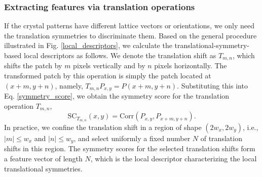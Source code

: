 \documentclass[twocolumn,amsmath, floatfix]{revtex4}
\begin{document}
\subsubsection{Extracting features via translation operations}
If the crystal patterns have different lattice vectors or orientations, we only need the translation symmetries to discriminate them.
Based on the general procedure illustrated in Fig. \ref{local_descriptors}, we calculate the translational-symmetry-based local descriptors as follows. We denote the translation shift as $T_{m,n}$, which shifts the patch by $m$ pixels vertically and by $n$ pixels horizontally.  The transformed patch by this operation is simply the patch located at $(x+m, y+n)$, namely, $T_{m,n}P_{x,y} = P(x+m, y+n)$. 
Substituting this into Eq. \eqref{symmetry_score}, we obtain the symmetry score for the translation operation $T_{m,n}$,
\begin{equation}
    \mathrm{SC}_{T_{m,n}} (x,y) = \mathrm{Corr}(P_{x,y}, P_{x+m, y+n}).
\end{equation}
In practice, we confine the translation shift in a region of shape $(2w_x,2w_y)$, i.e.,  $|m|\leq w_x$ and  $ |n|\leq w_y$, and select uniformly a fixed number $N$ of translation shifts in this region. The symmetry scores for the selected translation shifts form a feature vector of length $N$, which is the local descriptor characterizing the local translational symmetries.  
\end{document}
